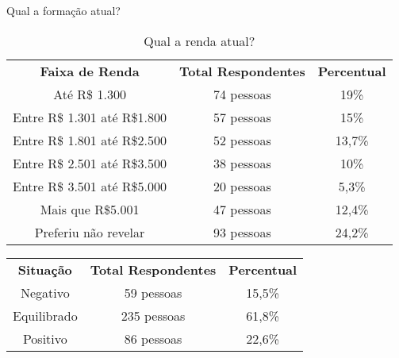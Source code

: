 \begin{apendicesenv}
\begin{table}[ht]
    \caption{Qual a formação atual?}
    \label{tab:formacao}
\end{table}

\begin{table}[ht]
    \centering
    \setlength{\extrarowheight}{3pt}  %

    \begin{center}
        \begin{minipage}{\textwidth}
            \centering
            \begin{tabular}{|c|c|c|}
                \textbf{Faixa de Renda} & \textbf{Total Respondentes} & \textbf{Percentual} \\
                Até R\$ 1.300 & 74 pessoas & 19\% \\
                Entre R\$ 1.301 até R\$1.800 & 57 pessoas & 15\% \\
                Entre R\$ 1.801 até R\$2.500 & 52 pessoas & 13,7\% \\
                Entre R\$ 2.501 até R\$3.500 & 38 pessoas & 10\% \\
                Entre R\$ 3.501 até R\$5.000 & 20 pessoas & 5,3\% \\
                Mais que R\$5.001 & 47 pessoas & 12,4\% \\
                Preferiu não revelar & 93 pessoas & 24,2\% \\
            \end{tabular}
        \end{minipage}
    \end{center}

    \caption{Qual a renda atual?}
    \label{tab:renda}
\end{table}

\begin{table}[ht]
    \centering
    \setlength{\extrarowheight}{3pt}  %

    \begin{center}
        \begin{minipage}{\textwidth}
            \centering
            \begin{tabular}{|c|c|c|}
                \textbf{Situação} & \textbf{Total Respondentes} & \textbf{Percentual} \\
                Negativo & 59 pessoas & 15,5\% \\
                Equilibrado & 235 pessoas & 61,8\% \\
                Positivo & 86 pessoas & 22,6\% \\
            \end{tabular}
        \end{minipage}
    \end{center}


\end{table}
\end{apendicesenv}
